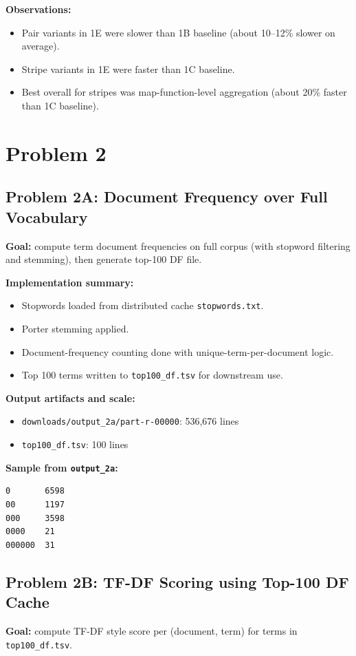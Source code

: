 \documentclass[11pt]{article}
\begin{document}
\textbf{Observations:}
\begin{itemize}[leftmargin=*]
  \item Pair variants in 1E were slower than 1B baseline (about 10--12\% slower on average).
  \item Stripe variants in 1E were faster than 1C baseline.
  \item Best overall for stripes was map-function-level aggregation (about 20\% faster than 1C baseline).
\end{itemize}

\section{Problem 2}

\subsection{Problem 2A: Document Frequency over Full Vocabulary}
\textbf{Goal:} compute term document frequencies on full corpus (with stopword filtering and stemming), then generate top-100 DF file.

\textbf{Implementation summary:}
\begin{itemize}[leftmargin=*]
  \item Stopwords loaded from distributed cache \texttt{stopwords.txt}.
  \item Porter stemming applied.
  \item Document-frequency counting done with unique-term-per-document logic.
  \item Top 100 terms written to \texttt{top100\_df.tsv} for downstream use.
\end{itemize}

\textbf{Output artifacts and scale:}
\begin{itemize}[leftmargin=*]
  \item \texttt{downloads/output\_2a/part-r-00000}: 536,676 lines
  \item \texttt{top100\_df.tsv}: 100 lines
\end{itemize}

\textbf{Sample from \texttt{output\_2a}:}
\begin{lstlisting}
0       6598
00      1197
000     3598
0000    21
000000  31
\end{lstlisting}

\subsection{Problem 2B: TF-DF Scoring using Top-100 DF Cache}
\textbf{Goal:} compute TF-DF style score per (document, term) for terms in \texttt{top100\_df.tsv}.
\end{document}
